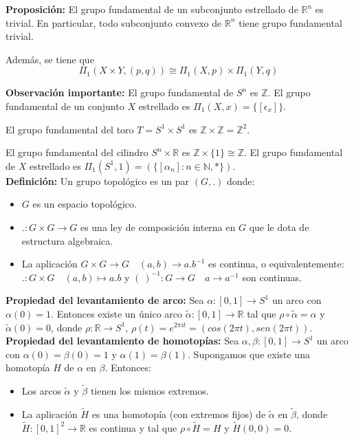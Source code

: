 \documentclass{article}
\begin{document}
\textbf{Proposición:} El grupo fundamental de un subconjunto estrellado de $\mathbb{R}^n$ es trivial. En particular, todo subconjunto convexo de $\mathbb{R}^n$ tiene grupo fundamental trivial.

Además, se tiene que 
\begin{equation*}
\Pi_1(X\times Y,(p,q))\cong\Pi_1(X,p)\times \Pi_1(Y,q)
\end{equation*}

\textbf{Observación importante:} El grupo fundamental de $S^n$ es $\mathbb{Z}$. El grupo fundamental de un conjunto $X$ estrellado es $\Pi_1(X,x)=\{[\epsilon_x]\}$.

El grupo fundamental del toro $T=S^1\times S^1$ es $\mathbb{Z}\times \mathbb{Z} = \mathbb{Z}^2$.

El grupo fundamental del cilindro $S^n\times \mathbb{R}$ es $\mathbb{Z}\times\{1\}\cong \mathbb{Z}$. El grupo fundamental de $X$ estrellado es $\Pi_1(S^1,1)=(\{[\alpha_n]:n\in \mathbb{N},*\})$.\\

\textbf{Definición:} Un grupo topológico es un par $(G,.)$ donde:
\begin{itemize}
\item $G$ es un espacio topológico.

\item $.:G\times G\rightarrow G$ es una ley de composición interna en $G$ que le dota de estructura algebraica.

\item La aplicación $G\times G\rightarrow G\quad (a,b)\rightarrow a. b^{-1}$ es continua, o equivalentemente: $.:G\times G\quad (a,b)\mapsto a.b$ y $(~)^{-1}:G\rightarrow G\quad a\rightarrow a^{-1}$ son continuas.
\end{itemize}

\textbf{Propiedad del levantamiento de arco:} Sea $\alpha:[0,1]\rightarrow S^1$ un arco con $\alpha(0)=1$. Entonces existe un único arco $\tilde{\alpha}:[0,1]\rightarrow \mathbb{R}$ tal que $\rho \circ \tilde{\alpha}=\alpha$ y $\tilde{\alpha}(0)=0$, donde $\rho:\mathbb{R}\rightarrow S^1$, $\rho(t)=e^{2\pi it}=(cos(2\pi t), sen(2\pi t))$. \\

\textbf{Propiedad del levantamiento de homotopías:} Sea $\alpha,\beta:[0,1]\rightarrow S^1$ un arco con $\alpha(0)=\beta(0)=1$ y $\alpha(1)=\beta(1)$. Supongamos que existe una homotopía $H$ de $\alpha$ en $\beta$. Entonces:
\begin{itemize}
\item Los arcos $\tilde{\alpha}$ y $\tilde{\beta}$ tienen los mismos extremos.

\item La aplicación $\tilde{H}$ es una homotopía (con extremos fijos) de $\tilde{\alpha}$ en $\tilde{\beta}$, donde $\tilde{H}:[0,1]^2\rightarrow \mathbb{R}$ es continua y tal que $\rho \circ \tilde{H}=H$ y $\tilde{H}(0,0)=0$.
\end{itemize}
\end{document}
